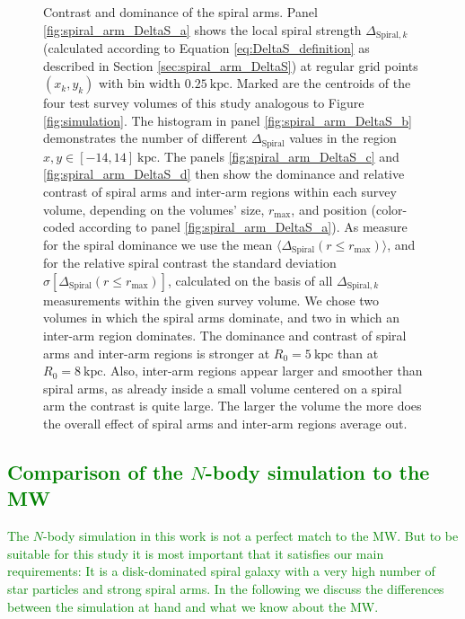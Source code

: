 \documentclass[iop,revtex4,numberedappendix,appendixfloats]{emulateapj}
\newcommand{\NEW}[1]{\textcolor{Green}{#1}}
\newcommand{\hiddenComment}[1]{}
\begin{document}
\begin{figure}[!htbp]
\caption{Contrast and dominance of the spiral arms. Panel \ref{fig:spiral_arm_DeltaS_a} shows the local spiral strength $\Delta_{\text{Spiral},k}$ (calculated according to Equation \eqref{eq:DeltaS_definition} as described in Section \ref{sec:spiral_arm_DeltaS}) at regular grid points $(x_k,y_k)$ with bin width $0.25~\text{kpc}$. Marked are the centroids of the four test survey volumes of this study analogous to Figure \ref{fig:simulation}. The histogram in panel \ref{fig:spiral_arm_DeltaS_b} demonstrates the number of different $\Delta_\text{Spiral}$ values in the region $x,y \in [-14,14]~\text{kpc}$. The panels \ref{fig:spiral_arm_DeltaS_c} and \ref{fig:spiral_arm_DeltaS_d} then show the dominance and relative  contrast of spiral arms and inter-arm regions within each survey volume, depending on the volumes' size, $r_\text{max}$, and position (color-coded according to panel \ref{fig:spiral_arm_DeltaS_a}). As measure for the spiral dominance we use the mean $\langle \Delta_\text{Spiral} (r \leq r_\text{max}) \rangle$, and for the relative spiral contrast the standard deviation $\sigma[\Delta_\text{Spiral} (r \leq r_\text{max})]$, calculated on the basis of all $\Delta_{\text{Spiral},k}$ measurements within the given survey volume. We chose two volumes in which the spiral arms dominate, and two in which an inter-arm region dominates. The dominance and contrast of spiral arms and inter-arm regions is stronger at $R_0=5~\text{kpc}$ than at $R_0=8~\text{kpc}$. Also, inter-arm regions appear larger and smoother than spiral arms, as already inside a small volume centered on a spiral arm the contrast is quite large. The larger the volume the more does the overall effect of spiral arms and inter-arm regions average out.  \hiddenComment{[TO DO: Jo suggested to look into implementing a $\text{sech}^2$ disk for galpy to not have the slight bias in mean($\kappa$) at higher rmax. Maybe it's easy to implement. Maybe it isn't. Reference for sech(z) disk: \url{http://adsabs.harvard.edu/abs/1989MNRAS.239..571K}]}}
\label{fig:spiral_arm_DeltaS}
\end{figure}

\subsection{\NEW{Comparison of the $N$-body simulation to the MW}} \label{sec:comparison_with_MW}

\NEW{The $N$-body simulation in this work is not a perfect match to the MW. But to be suitable for this study it is most important that it satisfies our main requirements:  It is a disk-dominated spiral galaxy with a very high number of star particles and strong spiral arms. In the following we discuss the differences between the simulation at hand and what we know about the MW.}
\end{document}

